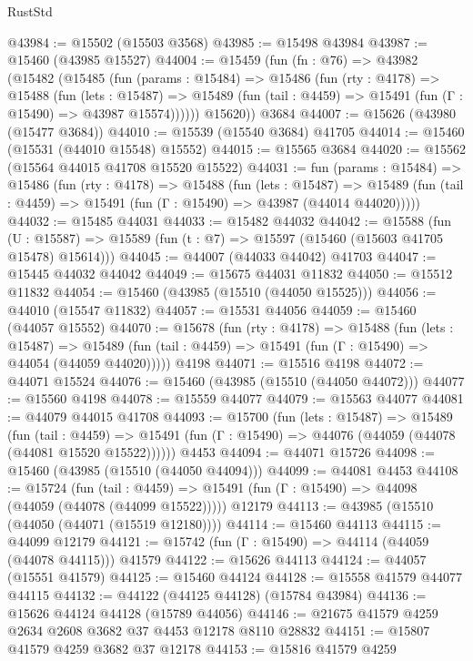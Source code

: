 \begin{lexlean}{RustStd}
\begin{coremodule}
@43984 := @15502 (@15503 @3568)
@43985 := @15498 @43984
@43987 := @15460 (@43985 @15527)
@44004 := @15459
    (fun (fn : @76) =>
    @43982
      (@15482
        (@15485
          (fun (params : @15484) =>
          @15486
            (fun (rty : @4178) =>
            @15488
              (fun (lets : @15487) =>
              @15489 (fun (tail : @4459) => @15491 (fun (Γ : @15490) => @43987 @15574))))))
        @15620))
    @3684
@44007 := @15626 (@43980 (@15477 @3684))
@44010 := @15539 (@15540 @3684) @41705
@44014 := @15460 (@15531 (@44010 @15548) @15552)
@44015 := @15565 @3684
@44020 := @15562 (@15564 @44015 @41708 @15520 @15522)
@44031 := fun (params : @15484) =>
  @15486
    (fun (rty : @4178) =>
    @15488
      (fun (lets : @15487) =>
      @15489 (fun (tail : @4459) => @15491 (fun (Γ : @15490) => @43987 (@44014 @44020)))))
@44032 := @15485 @44031
@44033 := @15482 @44032
@44042 := @15588
    (fun (U : @15587) => @15589 (fun (t : @7) => @15597 (@15460 (@15603 @41705 @15478) @15614)))
@44045 := @44007 (@44033 @44042) @41703
@44047 := @15445 @44032 @44042
@44049 := @15675 @44031 @11832
@44050 := @15512 @11832
@44054 := @15460 (@43985 (@15510 (@44050 @15525)))
@44056 := @44010 (@15547 @11832)
@44057 := @15531 @44056
@44059 := @15460 (@44057 @15552)
@44070 := @15678
    (fun (rty : @4178) =>
    @15488
      (fun (lets : @15487) =>
      @15489 (fun (tail : @4459) => @15491 (fun (Γ : @15490) => @44054 (@44059 @44020)))))
    @4198
@44071 := @15516 @4198
@44072 := @44071 @15524
@44076 := @15460 (@43985 (@15510 (@44050 @44072)))
@44077 := @15560 @4198
@44078 := @15559 @44077
@44079 := @15563 @44077
@44081 := @44079 @44015 @41708
@44093 := @15700
    (fun (lets : @15487) =>
    @15489
      (fun (tail : @4459) =>
      @15491 (fun (Γ : @15490) => @44076 (@44059 (@44078 (@44081 @15520 @15522))))))
    @4453
@44094 := @44071 @15726
@44098 := @15460 (@43985 (@15510 (@44050 @44094)))
@44099 := @44081 @4453
@44108 := @15724
    (fun (tail : @4459) => @15491 (fun (Γ : @15490) => @44098 (@44059 (@44078 (@44099 @15522)))))
    @12179
@44113 := @43985 (@15510 (@44050 (@44071 (@15519 @12180))))
@44114 := @15460 @44113
@44115 := @44099 @12179
@44121 := @15742 (fun (Γ : @15490) => @44114 (@44059 (@44078 @44115))) @41579
@44122 := @15626 @44113
@44124 := @44057 (@15551 @41579)
@44125 := @15460 @44124
@44128 := @15558 @41579 @44077 @44115
@44132 := @44122 (@44125 @44128) (@15784 @43984)
@44136 := @15626 @44124 @44128 (@15789 @44056)
@44146 := @21675 @41579 @4259 @2634 @2608 @3682 @37 @4453 @12178 @8110 @28832
@44151 := @15807 @41579 @4259 @3682 @37 @12178
@44153 := @15816 @41579 @4259

\end{coremodule}
\end{lexlean}
